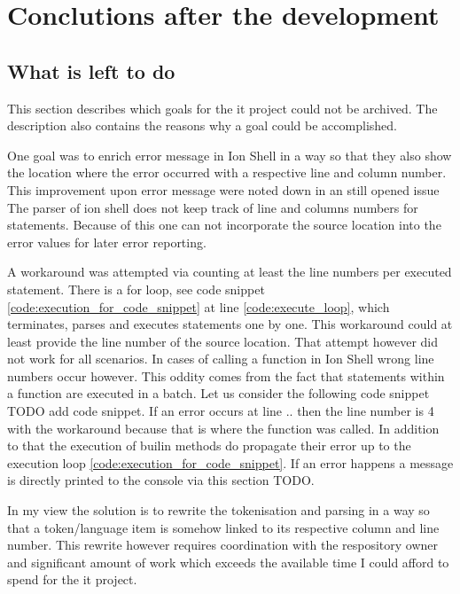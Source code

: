 \chapter{Conclutions after the development}

\section{What is left to do}

This section describes which goals for the it project could not be archived.
The description also contains the reasons why a goal could be accomplished.

One goal was to enrich error message in Ion Shell in a way
so that they also show the location where the error occurred with a respective line and column number.
This improvement upon error message were noted down in an still opened issue \cite{issue_enrich_error_message_information}
The parser of ion shell does not keep track of line and columns numbers for statements.
Because of this one can not incorporate the source location into the error values for later error reporting.

A workaround was attempted via counting at least the line numbers per executed statement.
There is a for loop, see code snippet \ref{code:execution_for_code_snippet} at line \ref{code:execute_loop},
which terminates, parses and executes statements one by one.
This workaround could at least provide the line number of the source location.
That attempt however did not work for all scenarios.
In cases of calling a function in Ion Shell wrong line numbers occur however.
This oddity comes from the fact that statements within a function are executed in a batch.
Let us consider the following code snippet TODO add code snippet.
If an error occurs at line .. then the line number is 4 with the workaround because that is where the function was called.
In addition to that the execution of builin methods do propagate their error up to the execution loop \ref{code:execution_for_code_snippet}.
If an error happens a message is directly printed to the console via this section TODO.

In my view the solution is to rewrite the tokenisation and parsing in a way so that
a token/language item is somehow linked to its respective column and line number.
This rewrite however requires  coordination with the respository owner and significant amount of work
which exceeds the available time I could afford to spend for the it project.

